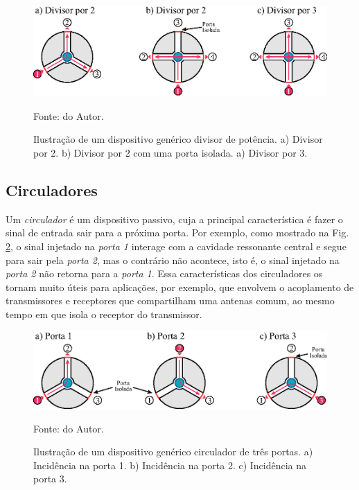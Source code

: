 \begin{figure}[H]
    \centering
    \includegraphics{04-Figuras/DividerDescription.eps}
    \caption{Ilustração de um dispositivo genérico divisor de potência. a) Divisor por 2. b) Divisor por 2 com uma porta isolada. a) Divisor por 3.} \par
    Fonte: do Autor.
    \label{fig: DividerDescription}
\end{figure}


\subsection{Circuladores}

Um \textit{circulador} é um dispositivo passivo, cuja a principal característica é fazer o sinal de entrada sair para a próxima porta. Por exemplo, como mostrado na Fig. \ref{fig: CirculatorDescription}, o sinal injetado na \textit{porta 1} interage com a cavidade ressonante central e segue para sair pela \textit{porta 2}, mas o contrário não acontece, isto é, o sinal injetado na \textit{porta 2} não retorna para a \textit{porta 1}. Essa características dos circuladores os tornam muito úteis para aplicações, por exemplo, que envolvem o acoplamento de transmissores e receptores que compartilham uma antenas comum, ao mesmo tempo em que isola o receptor do transmissor.

\begin{figure}[H]
    \centering
    \includegraphics{04-Figuras/CirculatorDescription.eps}
    \caption{Ilustração de um dispositivo genérico circulador de três portas. a) Incidência na porta 1. b) Incidência na porta 2. c) Incidência na porta 3.} \par
    Fonte: do Autor.
    \label{fig: CirculatorDescription}
\end{figure}

